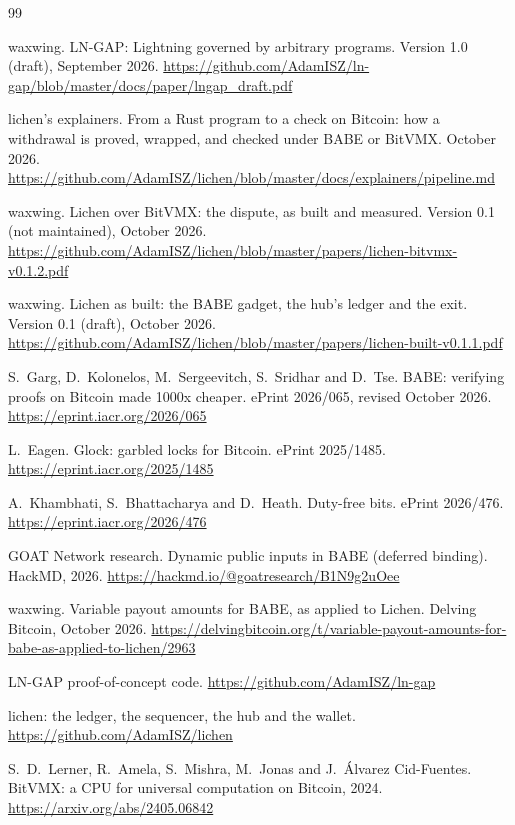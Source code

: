 \documentclass[11pt]{article}
\begin{document}
\begin{thebibliography}{99}

 waxwing. LN-GAP: Lightning governed by arbitrary programs. Version 1.0 (draft), September 2026. \url{https://github.com/AdamISZ/ln-gap/blob/master/docs/paper/lngap_draft.pdf}

 lichen's explainers. From a Rust program to a check on Bitcoin: how a withdrawal is proved, wrapped, and checked under BABE or BitVMX. October 2026. \url{https://github.com/AdamISZ/lichen/blob/master/docs/explainers/pipeline.md}

 waxwing. Lichen over BitVMX: the dispute, as built and measured. Version 0.1 (not maintained), October 2026. \url{https://github.com/AdamISZ/lichen/blob/master/papers/lichen-bitvmx-v0.1.2.pdf}

 waxwing. Lichen as built: the BABE gadget, the hub's ledger and the exit. Version 0.1 (draft), October 2026. \url{https://github.com/AdamISZ/lichen/blob/master/papers/lichen-built-v0.1.1.pdf}

 S.~Garg, D.~Kolonelos, M.~Sergeevitch, S.~Sridhar and D.~Tse. BABE: verifying proofs on Bitcoin made 1000x cheaper. ePrint 2026/065, revised October 2026. \url{https://eprint.iacr.org/2026/065}

 L.~Eagen. Glock: garbled locks for Bitcoin. ePrint 2025/1485. \url{https://eprint.iacr.org/2025/1485}

 A.~Khambhati, S.~Bhattacharya and D.~Heath. Duty-free bits. ePrint 2026/476. \url{https://eprint.iacr.org/2026/476}

 GOAT Network research. Dynamic public inputs in BABE (deferred binding). HackMD, 2026. \url{https://hackmd.io/@goatresearch/B1N9g2uOee}

 waxwing. Variable payout amounts for BABE, as applied to Lichen. Delving Bitcoin, October 2026. \url{https://delvingbitcoin.org/t/variable-payout-amounts-for-babe-as-applied-to-lichen/2963}

 LN-GAP proof-of-concept code. \url{https://github.com/AdamISZ/ln-gap}

 lichen: the ledger, the sequencer, the hub and the wallet. \url{https://github.com/AdamISZ/lichen}

 S.~D.~Lerner, R.~Amela, S.~Mishra, M.~Jonas and J.~\'Alvarez Cid-Fuentes. BitVMX: a CPU for universal computation on Bitcoin, 2024. \url{https://arxiv.org/abs/2405.06842}


\end{thebibliography}
\end{document}
